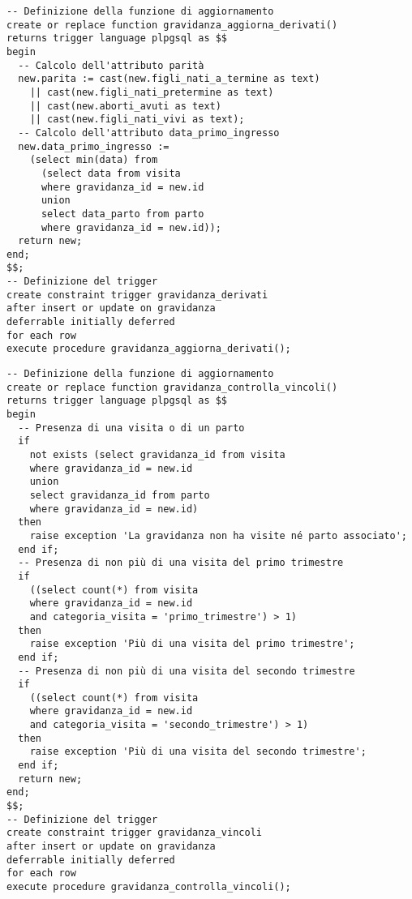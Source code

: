 \begin{lstlisting}[float,caption={Definizione del \emph{trigger} \tab{gravidanza\_derivati}.},label=ptrggravidanzaderivati]
-- Definizione della funzione di aggiornamento
create or replace function gravidanza_aggiorna_derivati()
returns trigger language plpgsql as $$
begin
  -- Calcolo dell'attributo parità
  new.parita := cast(new.figli_nati_a_termine as text)
    || cast(new.figli_nati_pretermine as text)
    || cast(new.aborti_avuti as text)
    || cast(new.figli_nati_vivi as text);
  -- Calcolo dell'attributo data_primo_ingresso
  new.data_primo_ingresso :=
    (select min(data) from
      (select data from visita
      where gravidanza_id = new.id
      union
      select data_parto from parto
      where gravidanza_id = new.id));
  return new;
end;
$$;
-- Definizione del trigger
create constraint trigger gravidanza_derivati
after insert or update on gravidanza
deferrable initially deferred
for each row
execute procedure gravidanza_aggiorna_derivati();
\end{lstlisting}

\begin{lstlisting}[float,caption={Definizione del \emph{trigger} \tab{gravidanza\_vincoli}.},label=ptrggravidanzavincoli]
-- Definizione della funzione di aggiornamento
create or replace function gravidanza_controlla_vincoli()
returns trigger language plpgsql as $$
begin
  -- Presenza di una visita o di un parto
  if
    not exists (select gravidanza_id from visita
    where gravidanza_id = new.id
    union
    select gravidanza_id from parto
    where gravidanza_id = new.id)
  then
    raise exception 'La gravidanza non ha visite né parto associato';
  end if;
  -- Presenza di non più di una visita del primo trimestre
  if
    ((select count(*) from visita
    where gravidanza_id = new.id
    and categoria_visita = 'primo_trimestre') > 1)
  then
    raise exception 'Più di una visita del primo trimestre';
  end if;
  -- Presenza di non più di una visita del secondo trimestre
  if
    ((select count(*) from visita
    where gravidanza_id = new.id
    and categoria_visita = 'secondo_trimestre') > 1)
  then
    raise exception 'Più di una visita del secondo trimestre';
  end if;
  return new;
end;
$$;
-- Definizione del trigger
create constraint trigger gravidanza_vincoli
after insert or update on gravidanza
deferrable initially deferred
for each row
execute procedure gravidanza_controlla_vincoli();
\end{lstlisting}

